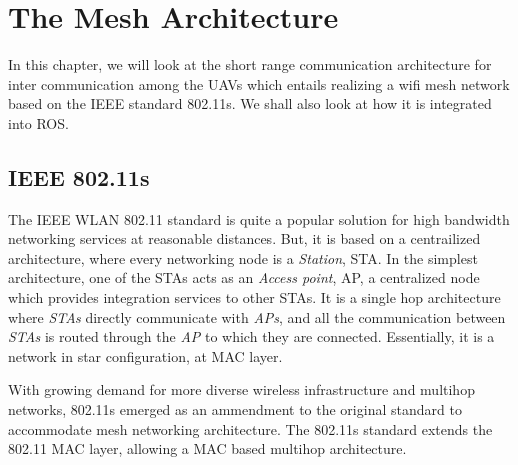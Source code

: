 
\chapter{The Mesh Architecture} %

\label{Chapter2} %


In this chapter, we will look at the short range communication architecture for inter communication among the UAVs which entails realizing a wifi mesh network based on the IEEE standard 802.11s. We shall also look at how it is integrated into ROS.


\section{IEEE 802.11s}
The IEEE WLAN 802.11 standard is quite a popular solution for high bandwidth networking services at reasonable distances. But, it is based on a centrailized architecture, where every networking node is a \textit{Station}, STA. In the simplest architecture, one of the STAs acts as an \textit{Access point}, AP, a centralized node which provides integration services to other STAs. It is a single hop architecture where \textit{STAs} directly communicate with \textit{APs}, and all the communication between \textit{STAs} is routed through the \textit{AP} to which they are connected. Essentially, it is a network in star configuration, at MAC layer.

With growing demand for more diverse wireless infrastructure and multihop networks, 802.11s \cite{802.11s} emerged as an ammendment to the original standard to accommodate mesh networking architecture. The 802.11s standard extends the 802.11 MAC layer, allowing a MAC based multihop architecture.

